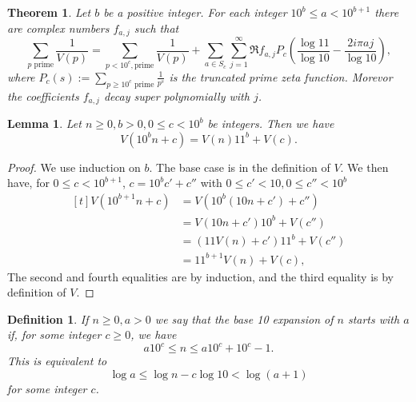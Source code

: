 \documentclass{article}
\newtheorem{lemma}[section]{Lemma}
\newtheorem{theorem}[section]{Theorem}
\newtheorem{definition}[section]{Definition}
\begin{document}
\begin{theorem}
  \label{thm:main}
  Let $b$ be a positive integer. For each integer $10^b \le a <
  10^{b+1}$ there are complex numbers $f_{a, j}$ such that
  \begin{equation}
    \label{eq:decomp}
    \sum_{p \text{ prime}} \frac{1}{V(p)} = \sum_{p < 10^c, \text{
        prime}}\frac{1}{V(p)} + \sum_{a \in S_c}
    \sum_{j=1}^\infty \Re f_{a,j}P_c\left(\frac{\log 11}{\log 10}
      - \frac{2 i \pi a j}{\log 10}\right),
  \end{equation}
  where $P_c(s) := \sum_{p \ge 10^c \text{ prime}} \frac{1}{p^s}$ is
  the truncated \emph{prime zeta function}. Morevor the coefficients
  $f_{a,j}$ decay super polynomially with $j$.
\end{theorem}
\begin{lemma}
  \label{lem:recursion}
  Let $n \ge 0, b > 0, 0 \le c < 10^b$ be integers. Then we have
  \begin{equation}
    \label{eq:recur}
    V(10^b n + c) = V(n) 11^b + V(c).
  \end{equation}
\end{lemma}
\begin{proof}
  We use induction on $b$. The base case is in the definition of $V$.
  We then have, for $0 \le c < 10^{b+1}$, $c = 10^b c' + c''$ with $0
  \le c' < 10, 0 \le c'' < 10^b$
  \begin{displaymath}
    \begin{aligned}[t]
      V(10^{b+1}n + c) & = V(10^b (10n + c') + c'') \\
      & = V(10n + c') 10^b + V(c'') \\
      & = (11 V(n) + c') 11^b + V(c'') \\
      & = 11^{b+1} V(n) + V(c),
    \end{aligned}
  \end{displaymath}
  The second and fourth equalities are by induction, and the third
  equality is by definition of $V$.
\end{proof}
\begin{definition}
  If $n \ge 0, a > 0$ we say that the base 10 expansion of $n$
  \emph{starts with $a$} if, for some integer $c \ge 0$, we have
  \begin{equation}
    \label{eq:bracket}
    a 10^c \le n \le a 10^c + 10^c - 1.
  \end{equation}
  This is equivalent to
  \begin{equation}
    \label{eq:starts}
    \log a \le \log n - c \log 10 < \log (a+1)
  \end{equation}
  for some integer $c$.
\end{definition}
\end{document}
